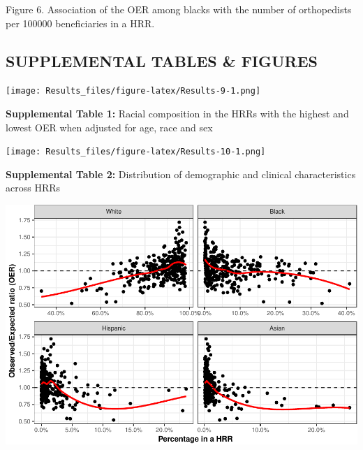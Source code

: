 \documentclass[]{article}
\begin{document}
Figure 6. Association of the OER among blacks with the number of
orthopedists per 100000 beneficiaries in a HRR.

\hypertarget{supplemental-tables-figures}{%
\subsection{SUPPLEMENTAL TABLES \&
FIGURES}\label{supplemental-tables-figures}}

\texttt{[image: Results\_files/figure-latex/Results-9-1.png]}

\textbf{Supplemental Table 1:} Racial composition in the HRRs with the
highest and lowest OER when adjusted for age, race and sex

\texttt{[image: Results\_files/figure-latex/Results-10-1.png]}

\textbf{Supplemental Table 2:} Distribution of demographic and clinical
characteristics across HRRs

\includegraphics{Results_files/figure-latex/Results-11-1.pdf}
\end{document}
